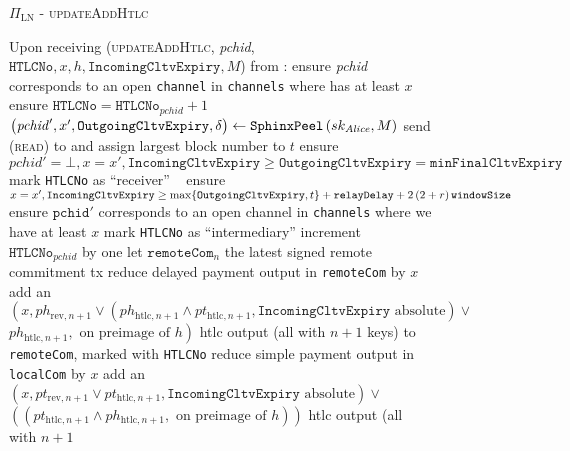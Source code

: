   \begin{figure}[H]
    \begin{protocolbox}{$\Pi_{\mathrm{LN}}$ - \textsc{updateAddHtlc}}
      \begin{algorithmic}[1]
        \State Upon receiving (\textsc{updateAddHtlc}, \textit{pchid},
        $\mathtt{HTLCNo}, x, h, \mathtt{IncomingCltvExpiry}, M$) from \bob:
        \Indent
          \State ensure \textit{pchid} corresponds to an open \texttt{channel}
          in \texttt{channels} where \bob{} has at least $x$
          \State ensure $\mathtt{HTLCNo} = \mathtt{HTLCNo}_{\mathit{pchid}} + 1$
          \State $\left(\mathit{pchid}', x', \mathtt{OutgoingCltvExpiry},
          \delta\right) \gets \mathtt{SphinxPeel}\left(sk_{\mathit{Alice}}, M\right)$
          \State send (\textsc{read}) to \ledger{} and assign largest block
          number to $t$
            \State ensure $\mathit{pchid}' = \bot, x = x',
            \mathtt{IncomingCltvExpiry} \geq \mathtt{OutgoingCltvExpiry} =
            \mathtt{minFinalCltvExpiry}$
            \State mark \texttt{HTLCNo} as ``receiver''
          \Else \ 
            \State ensure $x = x', \mathtt{IncomingCltvExpiry} \geq
            \max\{\mathtt{OutgoingCltvExpiry}, t\} + \mathtt{relayDelay} +
            2\left(2 + r\right)\texttt{windowSize}{}$
            \label{alg:protocol:pay:updateAddHtlc:slack}
            \State ensure $\mathtt{pchid}'$ corresponds to an open channel in
            \texttt{channels} where we have at least $x$
            \State mark \texttt{HTLCNo} as ``intermediary''
          \EndIf
          \State increment $\mathtt{HTLCNo}_{\mathit{pchid}}$ by one
          \State let $\mathtt{remoteCom}_n$ the latest signed remote commitment
          tx
          \State reduce delayed payment output in \texttt{remoteCom} by $x$
          \State add an $\left(x, ph_{\mathrm{rev}, n+1} \vee
          \left(ph_{\mathrm{htlc}, n+1} \wedge pt_{\mathrm{htlc}, n+1},
          \mathtt{IncomingCltvExpiry} \text{ absolute}\right) \vee\right.$
          $\left.ph_{\mathrm{htlc}, n+1}, \text{ on preimage of } h\right)$ htlc
          output (all with $n+1$ keys) to \texttt{remoteCom}, marked with
          \texttt{HTLCNo}
          \State reduce simple payment output in \texttt{localCom} by $x$
          \State add an $\left(x, pt_{\mathrm{rev}, n+1} \vee pt_{\mathrm{htlc},
          n+1}, \mathtt{IncomingCltvExpiry} \text{ absolute}\right) \vee$
          $\left(\left(pt_{\mathrm{htlc}, n+1} \wedge ph_{\mathrm{htlc}, n+1},
          \text{ on preimage of } h\right)\right)$ htlc output (all with $n+1$

\end{algorithmic}
\end{protocolbox}
\end{figure}
